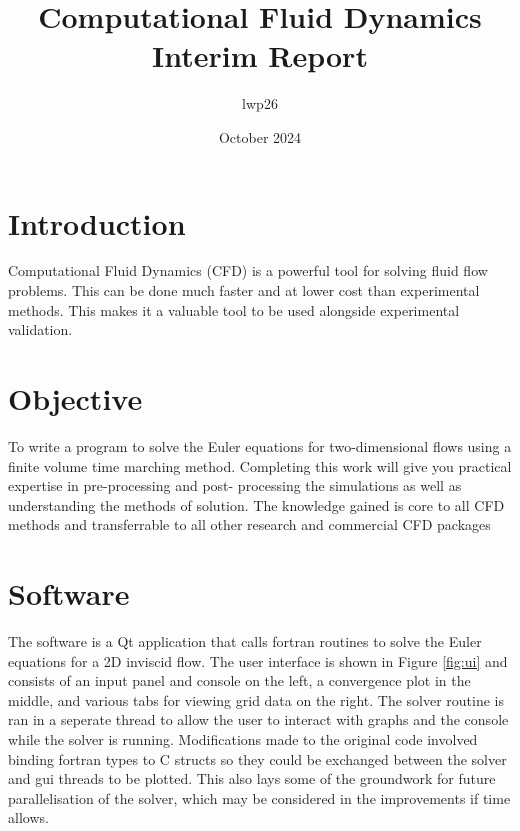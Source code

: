 \documentclass{article}
\begin{document}
\title{Computational Fluid Dynamics \\
    \large Interim Report}
\author{lwp26}
\date{October 2024}
\maketitle 

\section{Introduction}

Computational Fluid Dynamics (CFD) is a powerful tool for solving fluid flow problems.
This can be done much faster and at lower cost than experimental methods.
This makes it a valuable tool to be used alongside experimental validation.

\section{Objective}

To write a program to solve the Euler equations for two-dimensional flows using a finite volume time
marching method. Completing this work will give you practical expertise in pre-processing and post-
processing the simulations as well as understanding the methods of solution. The knowledge gained
is core to all CFD methods and transferrable to all other research and commercial CFD packages

\section{Software}

The software is a Qt application that calls fortran routines to solve the Euler equations for a 2D inviscid flow.
The user interface is shown in Figure \ref{fig:ui} and consists of an input panel and console on the left,
a convergence plot in the middle, and various tabs for viewing grid data on the right.
The solver routine is ran in a seperate thread to allow the user to interact with graphs and the console while the solver is running.
Modifications made to the original code involved binding fortran types to C structs so they could be exchanged between the solver and gui threads to be plotted.
This also lays some of the groundwork for future parallelisation of the solver, which may be considered in the improvements if time allows.
\end{document}
